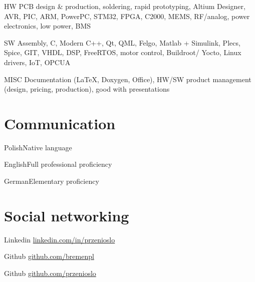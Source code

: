 \documentclass{tccv}
\begin{document}
\begin{factlist}

\item{HW}
     {PCB design \& production, soldering, rapid prototyping, Altium Designer, AVR, PIC, ARM, PowerPC, STM32, FPGA, C2000, MEMS, RF/analog, power electronics, low power, BMS}

\item{SW}
     {Assembly, C, Modern C++, Qt, QML, Felgo, Matlab + Simulink, Plecs, Spice, GIT, VHDL, DSP, FreeRTOS, motor control, Buildroot/ Yocto, Linux drivers, IoT, OPCUA}
     
\item{MISC}
     {Documentation (\LaTeX, Doxygen, Office), HW/SW product management (design, pricing, production), good with presentations}

\end{factlist}

\section{Communication}

\begin{factlist}
\item{Polish}{Native language}
\item{English}{Full professional proficiency}
\item{German}{Elementary proficiency}
\end{factlist}

\section{Social networking}

\begin{factlist}

\item{Linkedin}
     {\href{http://pl.linkedin.com/in/przenioslo}{linkedin.com/in/przenioslo}}
     
\item{Github}
     {\href{http://github.com/bremenpl}{github.com/bremenpl}}
     
\item{Github}
     {\href{http://github.com/przenioslo}{github.com/przenioslo}}

\end{factlist} 

\vspace*{\fill} %
\end{document}
